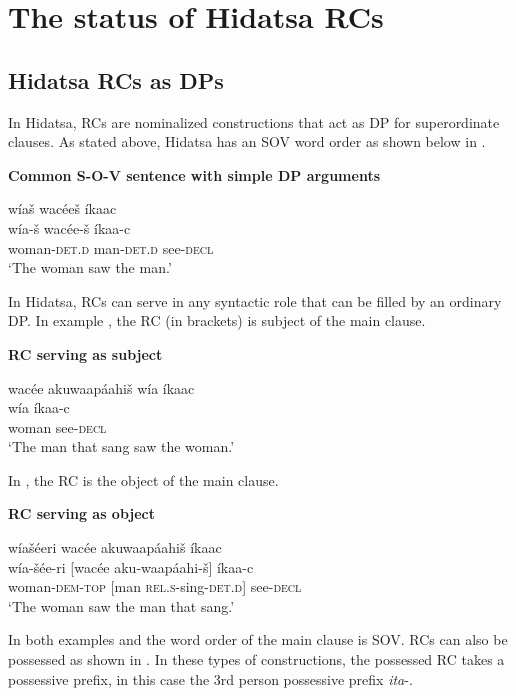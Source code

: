 \documentclass[output=paper]{LSP/langsci}
\begin{document}
\section{The status of Hidatsa RCs}

\subsection{Hidatsa RCs as DPs} 

In Hidatsa, RCs are nominalized constructions that act as DP for superordinate clauses. As stated above, Hidatsa has an SOV word order as shown below in .

\ea \textbf{Common S-O-V sentence with simple DP arguments} \label{boyle1}

\glll w\'ia\v{s} wac\'ee\v{s} \'ikaac\\
w\'ia-\v{s}  wac\'ee-\v{s} \'ikaa-c\\
woman-\textsc{det.d} man-\textsc{det.d} see-\textsc{decl}\\
\trans`The woman saw the man.' 
\z

In Hidatsa, RCs can serve in any syntactic role that can be filled by an ordinary DP. In example , the RC (in brackets) is subject of the main clause.  

\ea \textbf{RC serving as subject} \label{boyle2}

\glll {\ob}wac\'ee akuwaap\'aahi\v{s}{\cb}  w\'ia \'ikaac\\	
[wac\'ee aku-waap\'aahi-\v{s}] w\'ia  \'ikaa-c\\
[man \textsc{rel.s}-sing-\textsc{det.d}] woman see-\textsc{decl}\\
\trans`The man that sang saw the woman.' 
\z

In , the RC is the object of the main clause.

\ea \textbf{RC serving as object} \label{boyle3}

\glll w\'ia\v{s}\'eeri  {\ob}wac\'ee akuwaap\'aahi\v{s}{\cb}  \'ikaac\\
w\'ia-\v{s}\'ee-ri  [wac\'ee aku-waap\'aahi-\v{s}] \'ikaa-c\\
woman-\textsc{dem-top} [man \textsc{rel.s}-sing-\textsc{det.d}] see-\textsc{decl}\\
\trans `The woman saw the man that sang.' 
\z

In both examples  and  the word order of the main clause is SOV. RCs can also be possessed as shown in . In these types of constructions, the possessed RC takes a possessive prefix, in this case the 3rd person possessive prefix \textit{ita}-.
\end{document}
